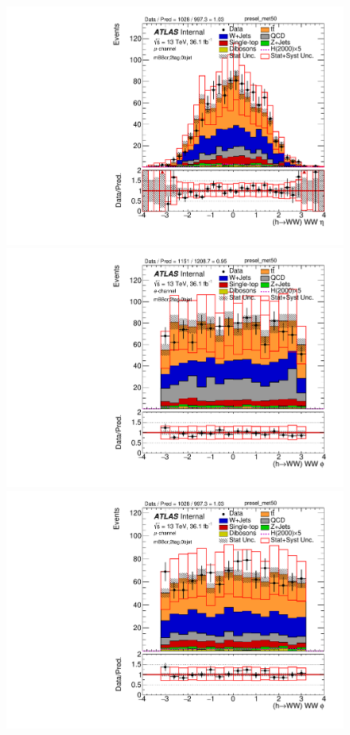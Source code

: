 \begin{figure}[!h]
\begin{center}
\includegraphics[scale=0.33]{./figures/boosted/PlotByChannels/DataMC_2tag_0bjet_mbbcr_muon_presel_met50_WWEta}                                                                                      
\includegraphics[scale=0.33]{./figures/boosted/PlotByChannels/DataMC_2tag_0bjet_mbbcr_elec_presel_met50_WWPhi}                                                                                      
\includegraphics[scale=0.33]{./figures/boosted/PlotByChannels/DataMC_2tag_0bjet_mbbcr_muon_presel_met50_WWPhi}                                                                                      

\end{center}
\end{figure}
